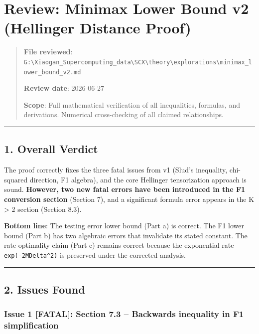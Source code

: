 \documentclass[
  12pt,
]{article}
\author{SCX}
\date{2026}
\begin{document}
\section{Review: Minimax Lower Bound v2 (Hellinger Distance
Proof)}\label{review-minimax-lower-bound-v2-hellinger-distance-proof}

\begin{quote}
\textbf{File reviewed}:
\texttt{G:\textbackslash{}Xiaogan\_Supercomputing\_data\textbackslash{}SCX\textbackslash{}theory\textbackslash{}explorations\textbackslash{}minimax\_lower\_bound\_v2.md}

\textbf{Review date}: 2026-06-27

\textbf{Scope}: Full mathematical verification of all inequalities,
formulas, and derivations. Numerical cross-checking of all claimed
relationships.
\end{quote}

\begin{center}\rule{0.5\linewidth}{0.5pt}\end{center}

\subsection{1. Overall Verdict}\label{overall-verdict}

The proof correctly fixes the three fatal issues from v1 (Slud's
inequality, chi-squared direction, F1 algebra), and the core Hellinger
tensorization approach is sound. \textbf{However, two new fatal errors
have been introduced in the F1 conversion section} (Section 7), and a
significant formula error appears in the K \textgreater{} 2 section
(Section 8.3).

\textbf{Bottom line}: The testing error lower bound (Part a) is correct.
The F1 lower bound (Part b) has two algebraic errors that invalidate its
stated constant. The rate optimality claim (Part c) remains correct
because the exponential rate \texttt{exp(-2MDelta\^{}2)} is preserved
under the corrected analysis.

\begin{center}\rule{0.5\linewidth}{0.5pt}\end{center}

\subsection{2. Issues Found}\label{issues-found}

\subsubsection{Issue 1 {[}FATAL{]}: Section 7.3 -- Backwards inequality
in F1
simplification}\label{issue-1-fatal-section-7.3-backwards-inequality-in-f1-simplification}
\end{document}
